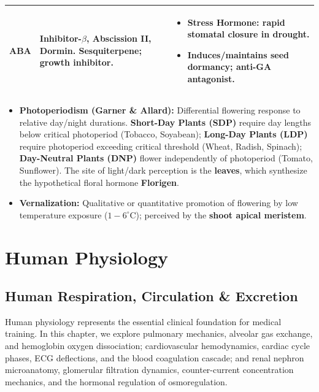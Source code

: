\documentclass[10pt,twoside,openright]{book}
\begin{document}
\begin{conceptbox}
\begin{center}
\begin{tabularx}{\linewidth}{>{\bfseries\RaggedRight}p{1.8cm} >{\RaggedRight}p{2.4cm} >{\RaggedRight}X}
\midrule
ABA & Inhibitor-$\beta$, Abscission II, Dormin. Sesquiterpene; growth inhibitor. & \begin{itemize}[leftmargin=*,nosep] \item \textbf{Stress Hormone}: rapid stomatal closure in drought. \item Induces/maintains \textbf{seed dormancy}; anti-GA antagonist. \end{itemize} \\
\bottomrule
\end{tabularx}
\end{center}
\end{conceptbox}

\begin{ncertbox}
\begin{itemize}[leftmargin=*]
  \item \textbf{Photoperiodism (Garner \& Allard):} Differential flowering response to relative day/night durations. \textbf{Short-Day Plants (SDP)} require day lengths below critical photoperiod (Tobacco, Soyabean); \textbf{Long-Day Plants (LDP)} require photoperiod exceeding critical threshold (Wheat, Radish, Spinach); \textbf{Day-Neutral Plants (DNP)} flower independently of photoperiod (Tomato, Sunflower). The site of light/dark perception is the \textbf{leaves}, which synthesize the hypothetical floral hormone \textbf{Florigen}.
  \item \textbf{Vernalization:} Qualitative or quantitative promotion of flowering by low temperature exposure ($1-6^\circ\mathrm{C}$); perceived by the \textbf{shoot apical meristem}.
\end{itemize}
\end{ncertbox}


\part{Human Physiology}

\chapter{Human Respiration, Circulation \& Excretion}

Human physiology represents the essential clinical foundation for medical training. In this chapter, we explore pulmonary mechanics, alveolar gas exchange, and hemoglobin oxygen dissociation; cardiovascular hemodynamics, cardiac cycle phases, ECG deflections, and the blood coagulation cascade; and renal nephron microanatomy, glomerular filtration dynamics, counter-current concentration mechanics, and the hormonal regulation of osmoregulation.
\end{document}
